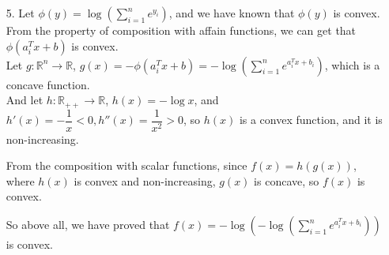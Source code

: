 \begin{itemize}
\item[5.] Let $\phi(y)=\log\left(\sum\limits_{i=1}^ne^{y_i}\right)$, and we have known that $\phi(y)$ is convex. \\
From the property of composition with affain functions, we can get that $\phi\left(a_i^Tx+b\right)$ is convex. \\
Let $g:\mathbb{R}^n\to\mathbb{R}$, $g(x) = -\phi(a_i^Tx+b) = -\log\left(\sum\limits_{i=1}^ne^{a_i^Tx+b_i}\right)$, which is a concave function. \\
And let $h:\mathbb{R}_{++}\to\mathbb{R}$, $h(x)=-\log x$, and $h'(x)=-\dfrac{1}{x}<0, h''(x)=\dfrac{1}{x^2}>0$, so $h(x)$ is a convex function, and it is non-increasing.

From the composition with scalar functions, since $f(x)=h\left(g(x)\right)$, where $h(x)$ is convex and non-increasing, $g(x)$ is concave, so $f(x)$ is convex.

So above all, we have proved that $f(x)=-\log\left(-\log\left(\sum\limits_{i=1}^ne^{a_i^Tx+b_i}\right)\right)$ is convex.

\end{itemize}

\newpage